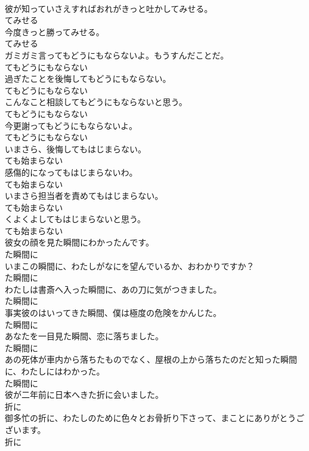 \documentclass[8pt]{extreport}
\begin{document}
\begin{CJK}{UTF8}{min}
\\	彼が知っていさえすればおれがきっと吐かしてみせる。	
\\	てみせる
\\	今度きっと勝ってみせる。	
\\	てみせる
\\	ガミガミ言ってもどうにもならないよ。もうすんだことだ。	
\\	てもどうにもならない
\\	過ぎたことを後悔してもどうにもならない。	
\\	てもどうにもならない
\\	こんなこと相談してもどうにもならないと思う。	
\\	てもどうにもならない
\\	今更謝ってもどうにもならないよ。	
\\	てもどうにもならない
\\	いまさら、後悔してもはじまらない。	
\\	ても始まらない
\\	感傷的になってもはじまらないわ。	
\\	ても始まらない
\\	いまさら担当者を責めてもはじまらない。	
\\	ても始まらない
\\	くよくよしてもはじまらないと思う。	
\\	ても始まらない
\\	彼女の顔を見た瞬間にわかったんです。	
\\	た瞬間に
\\	いまこの瞬間に、わたしがなにを望んでいるか、おわかりですか？	
\\	た瞬間に
\\	わたしは書斎へ入った瞬間に、あの刀に気がつきました。	
\\	た瞬間に
\\	事実彼のはいってきた瞬間、僕は極度の危険をかんじた。	
\\	た瞬間に
\\	あなたを一目見た瞬間、恋に落ちました。	
\\	た瞬間に
\\	あの死体が車内から落ちたものでなく、屋根の上から落ちたのだと知った瞬間に、わたしにはわかった。	
\\	た瞬間に
\\	彼が二年前に日本へきた折に会いました。	
\\	折に
\\	御多忙の折に、わたしのために色々とお骨折り下さって、まことにありがとうございます。	
\\	折に

\end{CJK}
\end{document}
